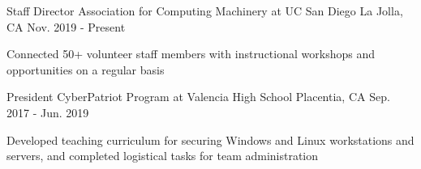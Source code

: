 

\begin{cventries}

  \cventry
    {Staff Director} %
    {Association for Computing Machinery at UC San Diego} %
    {La Jolla, CA} %
    {Nov. 2019 - Present} %
    {
      \begin{cvitems} %
        \item {Connected 50+ volunteer staff members with instructional workshops and opportunities on a regular basis}
      \end{cvitems}
    }

  \cventry
    {President} %
    {CyberPatriot Program at Valencia High School} %
    {Placentia, CA} %
    {Sep. 2017 - Jun. 2019} %
    {
      \begin{cvitems} %
        \item {Developed teaching curriculum for securing Windows and Linux workstations and servers, and completed logistical tasks for team administration}
      \end{cvitems}
    }

\end{cventries}
